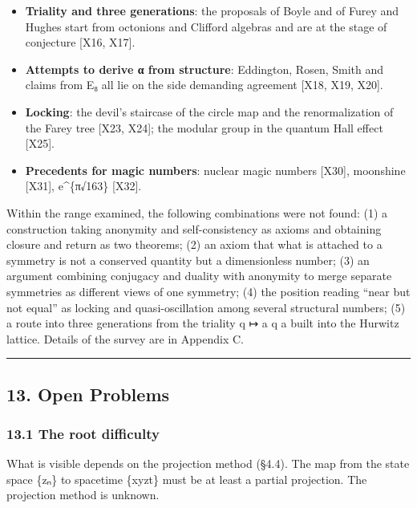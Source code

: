 \documentclass[
  a4paper,
]{article}
\begin{document}
\begin{itemize}
  Kaluza--Klein momentum and charge {[}X15{]}.
\item
  \textbf{Triality and three generations}: the proposals of Boyle and of
  Furey and Hughes start from octonions and Clifford algebras and are at
  the stage of conjecture {[}X16, X17{]}.
\item
  \textbf{Attempts to derive α from structure}: Eddington, Rosen, Smith
  and claims from E₈ all lie on the side demanding agreement {[}X18,
  X19, X20{]}.
\item
  \textbf{Locking}: the devil's staircase of the circle map and the
  renormalization of the Farey tree {[}X23, X24{]}; the modular group in
  the quantum Hall effect {[}X25{]}.
\item
  \textbf{Precedents for magic numbers}: nuclear magic numbers
  {[}X30{]}, moonshine {[}X31{]}, e\^{}\{π√163\} {[}X32{]}.
\end{itemize}

Within the range examined, the following combinations were not found:
(1) a construction taking anonymity and self-consistency as axioms and
obtaining closure and return as two theorems; (2) an axiom that what is
attached to a symmetry is not a conserved quantity but a dimensionless
number; (3) an argument combining conjugacy and duality with anonymity
to merge separate symmetries as different views of one symmetry; (4) the
position reading ``near but not equal'' as locking and quasi-oscillation
among several structural numbers; (5) a route into three generations
from the triality q ↦ a q a built into the Hurwitz lattice. Details of
the survey are in Appendix C.

\begin{center}\rule{0.5\linewidth}{0.5pt}\end{center}

\subsection{13. Open Problems}\label{open-problems}

\subsubsection{13.1 The root difficulty}\label{the-root-difficulty}

What is visible depends on the projection method (§4.4). The map from
the state space \{zₙ\} to spacetime \{xyzt\} must be at least a partial
projection. The projection method is unknown.
\end{document}
